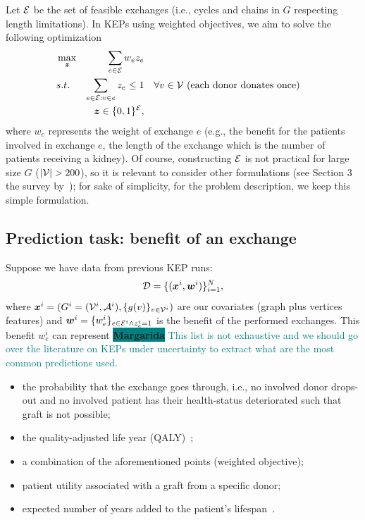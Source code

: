 \documentclass{article}
\newcommand{\margarida}[1]{\colorbox{teal}{\color{white}   \textsf{\textbf{Margarida}}} \textcolor{teal}{#1}}
\begin{document}
Let $\mathcal{E}$ be the set of feasible exchanges (i.e., cycles and chains in $G$ respecting length limitations). In KEPs using weighted objectives, we aim to solve the following optimization
\begin{align}
    & \max_{\boldsymbol{z}} & \sum_{e \in \mathcal{E}} w_e z_e \\
    & s.t. & \sum_{e \in \mathcal{E}: v \in e} z_e \leq 1 &\quad  \forall v \in \mathcal{V} \textrm{ (each donor donates once)}\\
    & & \boldsymbol{z} \in \{0,1\}^{\mathcal{E}},
\end{align}
where $w_e$ represents the weight of exchange $e$ (e.g., the benefit for the patients involved in exchange $e$, the length of the exchange which is the number of patients receiving a kidney). Of course, constructing $\mathcal{E}$ is not practical for large size $G$ ($|\mV|>200$), so it is relevant to consider other formulations (see Section 3 the survey by~\cite{barkel2025operational}); for sake of simplicity, for the problem description, we keep this simple formulation.

\subsection{Prediction task: benefit of an exchange} \label{subsec:predictiontask}
Suppose we have data from previous KEP runs:
$$\mathcal{D}=\{ (\boldsymbol{x}^i, \boldsymbol{w}^i) \}_{i=1}^N,$$
where $\boldsymbol{x}^i=(G^i=(\mathcal{V}^i,\mathcal{A}^i), \{g(v)\}_{v \in \mathcal{V}^i}) $ are our covariates (graph plus vertices features) and $\boldsymbol{w}^i=\{ w^i_e \}_{e \in \mathcal{E}^i \wedge z^i_e=1}$ is the benefit of the performed exchanges. This benefit $w_e^i$ can represent \margarida{This list is not exhaustive and we should go over the literature on KEPs under uncertainty to extract what are the most common predictions used.}
\begin{itemize}
    \item the probability that the exchange goes through, i.e., no involved donor drops-out and no involved patient has their health-status deteriorated such that graft is not possible;
    \item the quality-adjusted life year (QALY)~\citep{glorie2022health};
    \item a combination of the aforementioned points (weighted objective);
    \item patient utility associated with a graft from a specific donor;
    \item expected number of years added to the patient’s lifespan~\citep{krikov2007predicting}.
\end{itemize}
\end{document}
